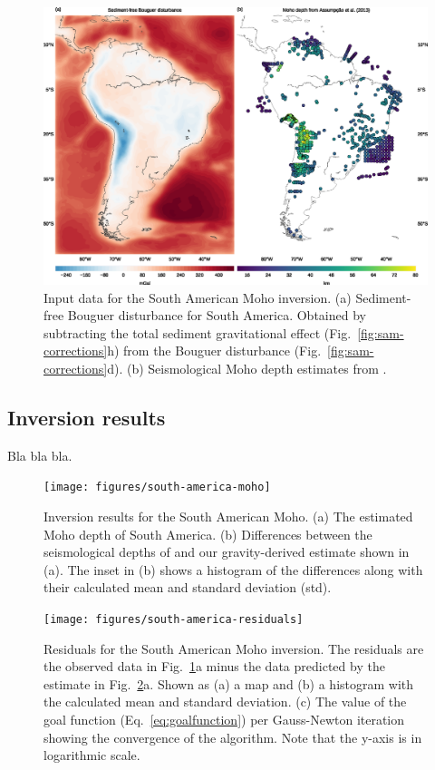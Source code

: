 \documentclass[extra]{gji}
\begin{document}
\begin{figure}
    \centering
    \includegraphics[width=\textwidth]{figures/south-america-data}
    \caption{
        Input data for the South American Moho inversion.
        (a) Sediment-free Bouguer disturbance for South America.
        Obtained by subtracting the total sediment gravitational effect
        (Fig.~\ref{fig:sam-corrections}h) from the Bouguer disturbance
        (Fig.~\ref{fig:sam-corrections}d).
        (b) Seismological Moho depth estimates from
        \citet{assumpcao2012}.
    }
    \label{fig:sam-data}
\end{figure}


\subsection{Inversion results}

Bla bla bla.

\begin{figure}
    \centering
    \texttt{[image: figures/south-america-moho]}
    \caption{
        Inversion results for the South American Moho.
        (a) The estimated Moho depth of South America.
        (b) Differences between the seismological depths of
        \citet{assumpcao2012} and our gravity-derived estimate shown in (a).
        The inset in (b) shows a histogram of the differences along with their
        calculated mean and standard deviation (std).
    }
    \label{fig:sam-moho}
\end{figure}

\begin{figure}
    \centering
    \texttt{[image: figures/south-america-residuals]}
    \caption{
        Residuals for the South American Moho inversion.
        The residuals are the observed data in Fig.~\ref{fig:sam-data}a
        minus the data predicted by the estimate in Fig.~\ref{fig:sam-moho}a.
        Shown as (a) a map and (b) a histogram with the calculated mean and
        standard deviation.
        (c) The value of the goal function (Eq.~\ref{eq:goalfunction})
        per Gauss-Newton iteration showing the convergence of the algorithm.
        Note that the y-axis is in logarithmic scale.
    }
    \label{fig:sam-residuals}
\end{figure}
\end{document}
